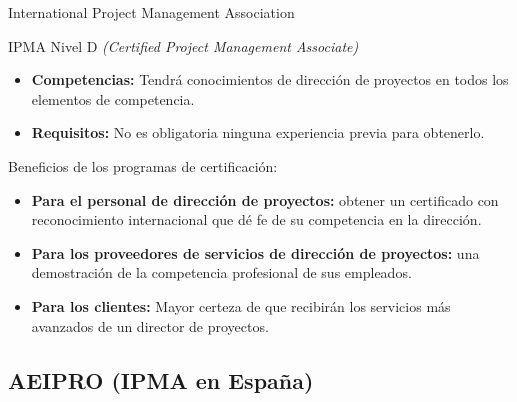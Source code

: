 \begin{frame}[allowframebreaks]{International Project Management Association}
	\begin{block}{IPMA Nivel D \emph{(Certified Project Management Associate)}}
		\begin{itemize}
			\item \textbf{Competencias:} Tendrá conocimientos de dirección de proyectos en todos los elementos de competencia.
			\item \textbf{Requisitos:} No es obligatoria ninguna experiencia previa para obtenerlo.
		\end{itemize}
	\end{block}
	
	\framebreak
	
	Beneficios de los programas de certificación:
	
	\begin{itemize}
		\item \textbf{Para el personal de dirección de proyectos:} obtener un certificado con reconocimiento internacional que dé fe de su competencia en la dirección.
		\item \textbf{Para los proveedores de servicios de dirección de proyectos:} una demostración de la competencia profesional de sus empleados.
		\item \textbf{Para los clientes:} Mayor certeza de que recibirán los servicios más avanzados de un director de proyectos.
	\end{itemize}
\end{frame}

\subsection{AEIPRO (IPMA en España)}


